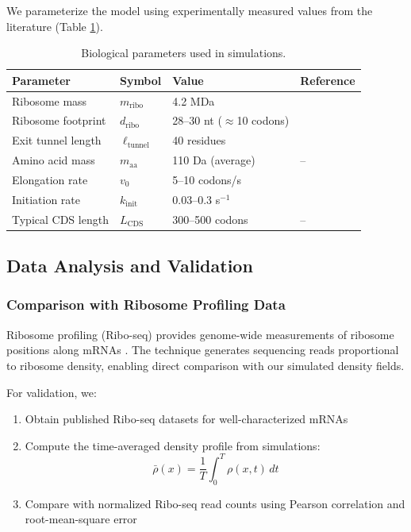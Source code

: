 \documentclass[11pt]{article}
\begin{document}
We parameterize the model using experimentally measured values from the literature (Table \ref{tab:parameters}).

\begin{table}[h]
\centering
\begin{tabular}{llll}
\toprule
\textbf{Parameter} & \textbf{Symbol} & \textbf{Value} & \textbf{Reference} \\
\midrule
Ribosome mass & $m_{\text{ribo}}$ & 4.2 MDa & \cite{ben2011quantifying} \\
Ribosome footprint & $d_{\text{ribo}}$ & 28--30 nt ($\approx$10 codons) & \cite{wolin1988ribosome} \\
Exit tunnel length & $\ell_{\text{tunnel}}$ & 40 residues & \cite{wilson2011ribosome} \\
Amino acid mass & $m_{\text{aa}}$ & 110 Da (average) & -- \\
Elongation rate & $v_0$ & 5--10 codons/s & \cite{ingolia2011ribosome} \\
Initiation rate & $k_{\text{init}}$ & 0.03--0.3 s$^{-1}$ & \cite{shah2013rate} \\
Typical CDS length & $L_{\text{CDS}}$ & 300--500 codons & -- \\
\bottomrule
\end{tabular}
\caption{Biological parameters used in simulations.}
\label{tab:parameters}
\end{table}

\subsection{Data Analysis and Validation}

\subsubsection{Comparison with Ribosome Profiling Data}

Ribosome profiling (Ribo-seq) provides genome-wide measurements of ribosome positions along mRNAs \cite{ingolia2009genome}. The technique generates sequencing reads proportional to ribosome density, enabling direct comparison with our simulated density fields.

For validation, we:
\begin{enumerate}[nosep]
    \item Obtain published Ribo-seq datasets for well-characterized mRNAs
    \item Compute the time-averaged density profile from simulations:
    \begin{equation}
        \bar{\rho}(x) = \frac{1}{T} \int_0^T \rho(x, t) \, dt
    \end{equation}
    \item Compare with normalized Ribo-seq read counts using Pearson correlation and root-mean-square error
\end{enumerate}
\end{document}
